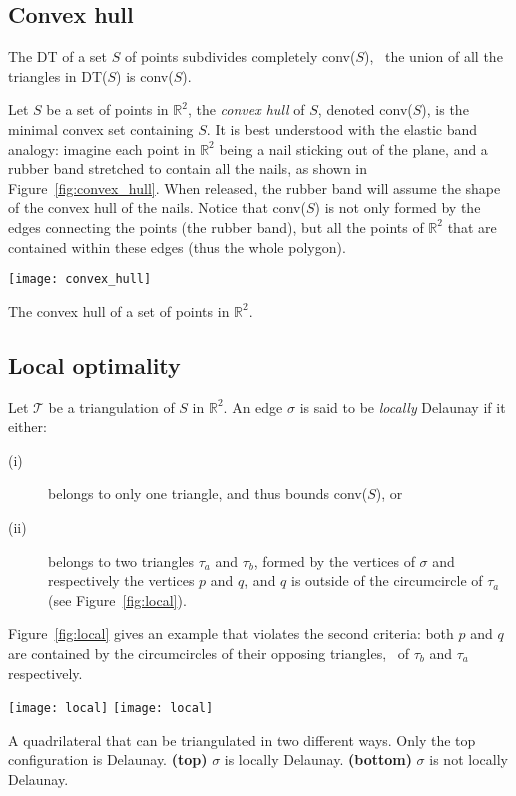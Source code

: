 %
\subsection{Convex hull}%
\label{sec:convexhull}

The DT of a set $S$ of points subdivides completely conv($S$), \ie\ the union of all the triangles in DT($S$) is conv($S$).

Let $S$ be a set of points in $\mathbb{R}^2$, the \emph{convex hull} of $S$, denoted conv($S$), is the minimal convex set containing $S$. 
It is best understood with the elastic band analogy: imagine each point in $\mathbb{R}^2$ being a nail sticking out of the plane, and a rubber band stretched to contain all the nails, as shown in Figure~\ref{fig:convex_hull}. 
When released, the rubber band will assume the shape of the convex hull of the nails. 
Notice that conv($S$) is not only formed by the edges connecting the points (the rubber band), but all the points of $\mathbb{R}^2$ that are contained within these edges (thus the whole polygon).
\begin{marginfigure}
  \centering
  \texttt{[image: convex\_hull]}
  \caption{The convex hull of a set of points in $\mathbb{R}^2$.}%
\label{fig:convex_hull}
\end{marginfigure}

%
\subsection{Local optimality}
Let $\mathcal{T}$ be a triangulation of $S$ in $\mathbb{R}^2$. 
An edge $\sigma$ is said to be \emph{locally} Delaunay if it either:
\begin{description}
  \item[(i)] belongs to only one triangle, and thus bounds conv($S$), or
  \item[(ii)] belongs to two triangles $\tau_a$ and $\tau_b$, formed by the vertices of $\sigma$ and respectively the vertices $p$ and $q$, and $q$ is outside of the circumcircle of $\tau_a$ (see Figure~\ref{fig:local}). 
\end{description}
Figure~\ref{fig:local} gives an example that violates the second criteria: both $p$ and $q$ are contained by the circumcircles of their opposing triangles, \ie\ of $\tau_b$ and $\tau_a$ respectively.

\begin{marginfigure}
  \centering
  \texttt{[image: local]}
  \texttt{[image: local]}
  \caption{A quadrilateral that can be triangulated in two different ways. Only the top configuration is Delaunay. \textbf{(top)} $\sigma$ is locally Delaunay. \textbf{(bottom)} $\sigma$ is not locally Delaunay.}%
\label{fig:local}
\end{marginfigure}

